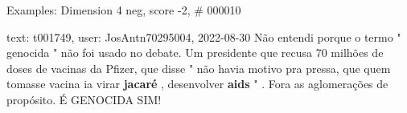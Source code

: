 \begin{frame}{Examples: Dimension 4 neg, score -2, \# 000010}
\footnotesize
\begin{alertblock}{text: t001749, user: JosAntn70295004, 2022-08-30}
Não entendi porque o termo " genocida " não foi usado no debate. Um presidente 
que recusa 70 milhões de doses de vacinas da Pfizer, que disse " não havia 
motivo pra pressa, que quem tomasse vacina ia virar \textbf{jacaré} , 
desenvolver \textbf{aids} " . Fora as aglomerações de propósito. É GENOCIDA 
SIM! 
\end{alertblock}
\end{frame}
